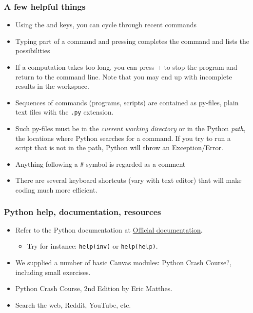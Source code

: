  
 {\nologo
 \begin{frame}[fragile]
  \frametitle{A few helpful things}
  \begin{itemize}[<+->]
    \item Using the \keystroke{$\uparrow$} and \keystroke{$\downarrow$} keys, you can cycle through recent commands
    \item Typing part of a command and pressing  completes the command and lists the possibilities
    \item If a computation takes too long, you can press + to stop the program and return to the command line. Note that you may end up with incomplete results in the workspace.
    \item Sequences of commands (programs, scripts) are contained as py-files, plain text files with the \lstinline$.py$ extension.
    \item Such py-files must be in the \emph{current working directory} or in the Python \emph{path}, the locations where Python searches for a command. If you try to run a script that is not in the path, Python will throw an Exception/Error.
    \item Anything following a \lstinline$#$ symbol is regarded as a comment
    \item There are several keyboard shortcuts (vary with text editor) that will make coding much more efficient.
  \end{itemize}
\end{frame}
}

\begin{frame}[fragile]
\frametitle{Python help, documentation, resources}
\begin{itemize}[<+->]
  \item Refer to the Python documentation at \href{https://docs.python.org/3/}{Official documentation}.
  \begin{itemize}
    \item Try for instance: \lstinline$help(inv)$ or \lstinline$help(help)$.
  \end{itemize}
  \item We supplied a number of basic Canvas modules: Python Crash Course?, including small exercises.
  \item Python Crash Course, 2nd Edition by Eric Matthes.
  \item Search the web, Reddit, YouTube, etc.
\end{itemize}
\end{frame}

